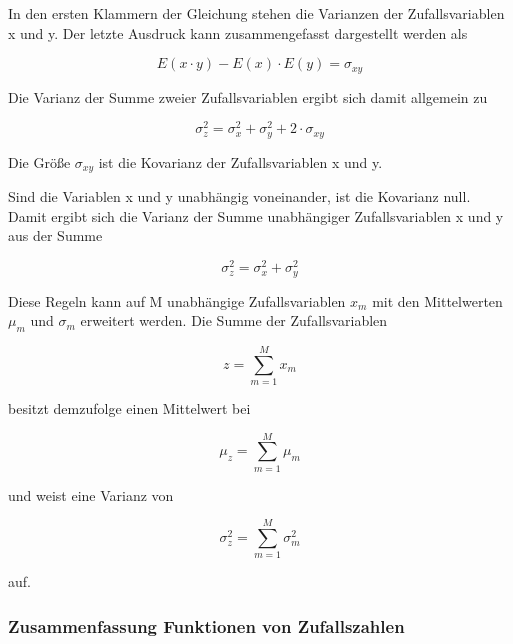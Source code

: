 \noindent In den ersten Klammern der Gleichung stehen die Varianzen der Zufallsvariablen x und y. Der letzte Ausdruck kann zusammengefasst dargestellt werden als

\begin{equation}\label{eq:eightfiftyeight}
E(x\cdot y)-E(x)\cdot E(y)=\sigma _{xy}
\end{equation}

\noindent Die Varianz der Summe zweier Zufallsvariablen ergibt sich damit allgemein zu

\begin{equation}\label{eq:eightfiftynine}
\sigma _{z}^{2} =\sigma _{x}^{2} +\sigma _{y}^{2} +2\cdot \sigma _{xy}
\end{equation}

\noindent Die Gr\"{o}{\ss}e $\sigma_{xy}$ ist die Kovarianz der Zufallsvariablen x und y. \newline

\noindent Sind die Variablen x und y unabh\"{a}ngig voneinander, ist die Kovarianz null. Damit ergibt sich die Varianz der Summe unabh\"{a}ngiger Zufallsvariablen x und y aus der Summe 

\begin{equation}\label{eq:eightsixty}
\sigma _{z}^{2} =\sigma _{x}^{2} +\sigma _{y}^{2}
\end{equation}

\noindent Diese Regeln kann auf M unabh\"{a}ngige Zufallsvariablen $x_{m}$ mit den Mittelwerten $\mu_{m}$ und $\sigma_{m}$ erweitert werden. Die Summe der Zufallsvariablen

\begin{equation}\label{eq:eightsixtyone}
z=\sum _{m=1}^{M}x_{m}
\end{equation}

\noindent besitzt demzufolge einen Mittelwert bei

\begin{equation}\label{eq:eightsixtytwo}
\mu _{z} =\sum _{m=1}^{M}\mu _{m}
\end{equation}

\noindent und weist eine Varianz von

\begin{equation}\label{eq:eightsixtythree}
\sigma _{z}^{2} =\sum _{m=1}^{M}\sigma _{m}^{2}
\end{equation}

\noindent auf. 

\subsubsection{Zusammenfassung Funktionen von Zufallszahlen}

